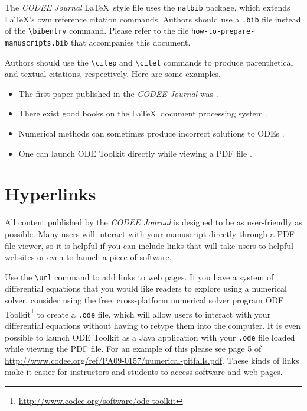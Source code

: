 \documentclass{codee}
\theoremstyle{definition}
\theoremstyle{remark}
\numberwithin{equation}{section}
\begin{document}
The \textit{CODEE Journal} \LaTeX\ style file uses the \texttt{natbib}
package, which extends \LaTeX's own reference citation
commands. Authors should use a \texttt{.bib} file instead of the
\texttt{\textbackslash bibentry} command. Please refer to the file
\texttt{how-to-prepare-manuscripts.bib} that accompanies this
document.

Authors should use the \texttt{\textbackslash citep} and \texttt{\textbackslash citet} commands to produce parenthetical and textual citations, respectively. Here are some examples.

\begin{itemize}
\item The first paper published in the \textit{CODEE Journal} was \citet{borrelli-coleman-2009}.
\item There exist good books on the \LaTeX\ document processing system \citep{gratzer-2004,lamport-1994}.
\item Numerical methods can sometimes produce incorrect solutions to ODEs \citep{borrelli-coleman-2090}.
\item One can launch ODE Toolkit directly while viewing a PDF file \citep[see][page 5]{borrelli-coleman-2009}.
\end{itemize}

\section{Hyperlinks}

All content published by the \textit{CODEE Journal} is designed to be
as user-friendly as possible. Many users will interact with your
manuscript directly through a PDF file viewer, so it is helpful if you
can include links that will take users to helpful websites or even to
launch a piece of software.

Use the \texttt{\textbackslash url} command to add links to web
pages. If you have a system of differential equations that you would
like readers to explore using a numerical solver, consider using the
free, cross-platform numerical solver program ODE
Toolkit\footnote{\url{http://www.codee.org/software/ode-toolkit}} to
create a \texttt{.ode} file, which will allow users to interact with
your differential equations without having to retype them into the
computer. It is even possible to launch ODE Toolkit as a Java
application with your \texttt{.ode} file loaded while viewing the PDF
file.  For an example of this please see page 5 of
\url{http://www.codee.org/ref/PA09-0157/numerical-pitfalls.pdf}. These
kinds of links make it easier for instructors and students to access
software and web pages.
\end{document}
